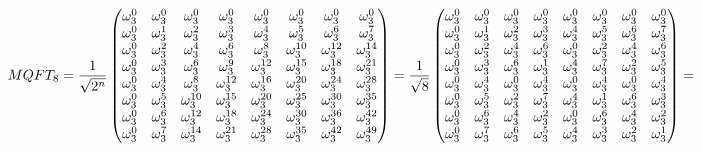 \documentclass{article}
\begin{document}
\[MQFT_8 =  
\frac{1}{\sqrt{2^n}} \begin{pmatrix} 
\omega_3^0 & \omega_3^0 & \omega_3^0 & \omega_3^0 & \omega_3^0 & \omega_3^0 & \omega_3^0 & \omega_3^0 \\ 
\omega_3^0 & \omega_3^1 & \omega_3^2 & \omega_3^3 & \omega_3^4 & \omega_3^5 & \omega_3^6 & \omega_3^7 \\ 
\omega_3^0 & \omega_3^2 & \omega_3^4 & \omega_3^6 & \omega_3^8 & \omega_3^{10} & \omega_3^{12} & \omega_3^{14} \\ 
\omega_3^0 & \omega_3^3 & \omega_3^6 & \omega_3^9 &\omega_3^{12} & \omega_3^{15} & \omega_3^{18} & \omega_3^{21} \\
\omega_3^0 & \omega_3^4 & \omega_3^8 & \omega_3^{12} & \omega_3^{16} & \omega_3^{20} & \omega_3^{24} & \omega_3^{28} \\ 
\omega_3^0 & \omega_3^5 & \omega_3^{10} & \omega_3^{15} & \omega_3^{20} & \omega_3^{25} & \omega_3^{30} & \omega_3^{35} \\ 
\omega_3^0 & \omega_3^6 & \omega_3^{12} & \omega_3^{18} & \omega_3^{24} & \omega_3^{30} & \omega_3^{36} & \omega_3^{42} \\ 
\omega_3^0 & \omega_3^7 & \omega_3^{14} & \omega_3^{21} & \omega_3^{28} & \omega_3^{35} & \omega_3^{42} & \omega_3^{49} \\ 
\end{pmatrix} =
\\
\frac{1}{\sqrt{8}} \begin{pmatrix} 
\omega_3^0 & \omega_3^0 & \omega_3^0 & \omega_3^0 & \omega_3^0 & \omega_3^0 & \omega_3^0 & \omega_3^0 \\ 
\omega_3^0 & \omega_3^1 & \omega_3^2 & \omega_3^3 & \omega_3^4 & \omega_3^5 & \omega_3^6 & \omega_3^7 \\ 
\omega_3^0 & \omega_3^2 & \omega_3^4 & \omega_3^6 & \omega_3^0 & \omega_3^{2} & \omega_3^{4} & \omega_3^{6} \\ 
\omega_3^0 & \omega_3^3 & \omega_3^6 & \omega_3^1 &\omega_3^{4} & \omega_3^{7} & \omega_3^{2} & \omega_3^{5} \\
\omega_3^0 & \omega_3^4 & \omega_3^0 & \omega_3^{4} & \omega_3^{0} & \omega_3^{4} & \omega_3^{0} & \omega_3^{4} \\ 
\omega_3^0 & \omega_3^5 & \omega_3^{2} & \omega_3^{7} & \omega_3^{4} & \omega_3^{1} & \omega_3^{6} & \omega_3^{3} \\ 
\omega_3^0 & \omega_3^6 & \omega_3^{4} & \omega_3^{2} & \omega_3^{0} & \omega_3^{6} & \omega_3^{4} & \omega_3^{2} \\ 
\omega_3^0 & \omega_3^7 & \omega_3^{6} & \omega_3^{5} & \omega_3^{4} & \omega_3^{3} & \omega_3^{2} & \omega_3^{1} \\ 
\end{pmatrix} = \]
\end{document}
